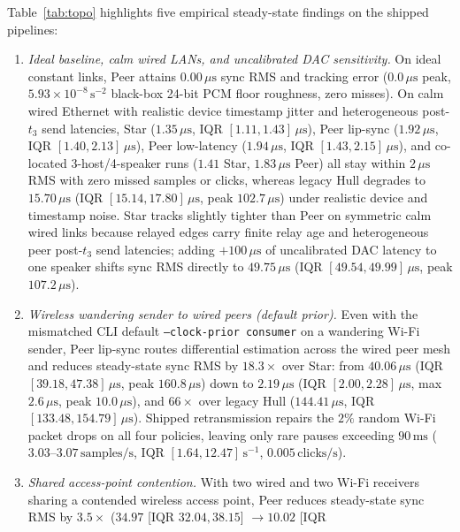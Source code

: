 \documentclass[11pt,a4paper]{article}
\theoremstyle{definition}
\begin{document}
Table~\ref{tab:topo} highlights five empirical steady-state findings on the
shipped pipelines:
\begin{enumerate}
\item \emph{Ideal baseline, calm wired LANs, and uncalibrated DAC sensitivity.}
  On ideal constant links, Peer attains $0.00\,\mu\text{s}$ sync RMS and
  tracking error ($0.0\,\mu\text{s}$ peak, $5.93{\times}10^{-8}\,\text{s}^{-2}$
  black-box 24-bit PCM floor roughness, zero misses). On calm wired Ethernet
  with realistic device timestamp jitter and heterogeneous post-$t_3$ send
  latencies, Star ($1.35\,\mu\text{s}$, IQR $[1.11, 1.43]\,\mu\text{s}$), Peer
  lip-sync ($1.92\,\mu\text{s}$, IQR $[1.40, 2.13]\,\mu\text{s}$), Peer
  low-latency ($1.94\,\mu\text{s}$, IQR $[1.43, 2.15]\,\mu\text{s}$), and
  co-located 3-host/4-speaker runs ($1.41$ Star, $1.83\,\mu\text{s}$ Peer) all
  stay within $2\,\mu\text{s}$ RMS with zero missed samples or clicks, whereas
  legacy Hull degrades to $15.70\,\mu\text{s}$ (IQR $[15.14, 17.80]\,\mu\text{s}$,
  peak $102.7\,\mu\text{s}$) under realistic device and timestamp noise. Star
  tracks slightly tighter than Peer on symmetric calm wired links because
  relayed edges carry finite relay age and heterogeneous peer post-$t_3$ send
  latencies; adding $+100\,\mu\text{s}$ of uncalibrated DAC latency to one
  speaker shifts sync RMS directly to $49.75\,\mu\text{s}$ (IQR
  $[49.54, 49.99]\,\mu\text{s}$, peak $107.2\,\mu\text{s}$).
\item \emph{Wireless wandering sender to wired peers (default prior).} Even
  with the mismatched CLI default \texttt{--clock-prior consumer} on a
  wandering Wi-Fi sender, Peer lip-sync routes differential estimation across
  the wired peer mesh and reduces steady-state sync RMS by $18.3\times$ over
  Star: from $40.06\,\mu\text{s}$ (IQR $[39.18, 47.38]\,\mu\text{s}$, peak
  $160.8\,\mu\text{s}$) down to $2.19\,\mu\text{s}$ (IQR
  $[2.00, 2.28]\,\mu\text{s}$, max $2.6\,\mu\text{s}$, peak $10.0\,\mu\text{s}$),
  and $66\times$ over legacy Hull ($144.41\,\mu\text{s}$, IQR
  $[133.48, 154.79]\,\mu\text{s}$). Shipped retransmission repairs the $2\%$
  random Wi-Fi packet drops on all four policies, leaving only rare pauses
  exceeding $90\,\text{ms}$ ($3.03$--$3.07\,\text{samples/s}$, IQR
  $[1.64, 12.47]\,\text{s}^{-1}$, $0.005\,\text{clicks/s}$).
\item \emph{Shared access-point contention.} With two wired and two Wi-Fi
  receivers sharing a contended wireless access point, Peer reduces steady-state
  sync RMS by $3.5\times$ ($34.97$ [IQR $32.04, 38.15$] $\to 10.02$ [IQR

\end{enumerate}
\end{document}
